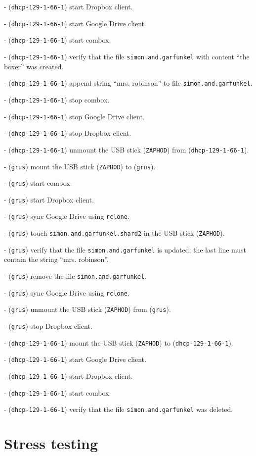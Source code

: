 - (\verb+dhcp-129-1-66-1+) start Dropbox client.

- (\verb+dhcp-129-1-66-1+) start Google Drive client.

- (\verb+dhcp-129-1-66-1+) start combox.

- (\verb+dhcp-129-1-66-1+) verify that the file
\verb+simon.and.garfunkel+ with content ``the boxer'' was created.

- (\verb+dhcp-129-1-66-1+) append string ``mrs. robinson'' to file
\verb+simon.and.garfunkel+.

- (\verb+dhcp-129-1-66-1+) stop combox.

- (\verb+dhcp-129-1-66-1+) stop Google Drive client.

- (\verb+dhcp-129-1-66-1+) stop Dropbox client.

- (\verb+dhcp-129-1-66-1+) unmount the USB stick (\verb+ZAPHOD+) from
(\verb+dhcp-129-1-66-1+).

- (\verb+grus+) mount the USB stick (\verb+ZAPHOD+) to (\verb+grus+).

- (\verb+grus+) start combox.

- (\verb+grus+) start Dropbox client.

- (\verb+grus+) sync Google Drive using \verb+rclone+.

- (\verb+grus+) touch \verb+simon.and.garfunkel.shard2+ in the USB
stick (\verb+ZAPHOD+).

- (\verb+grus+) verify that the file \verb+simon.and.garfunkel+ is
updated; the last line must contain the string ``mrs. robinson''.

- (\verb+grus+) remove the file \verb+simon.and.garfunkel+.

- (\verb+grus+) sync Google Drive using \verb+rclone+.

- (\verb+grus+) unmount the USB stick (\verb+ZAPHOD+) from
(\verb+grus+).

- (\verb+grus+) stop Dropbox client.

- (\verb+dhcp-129-1-66-1+) mount the USB stick (\verb+ZAPHOD+) to
(\verb+dhcp-129-1-66-1+).

- (\verb+dhcp-129-1-66-1+) start Google Drive client.

- (\verb+dhcp-129-1-66-1+) start Dropbox client.

- (\verb+dhcp-129-1-66-1+) start combox.

- (\verb+dhcp-129-1-66-1+) verify that the file
\verb+simon.and.garfunkel+ was deleted.


\section{Stress testing}

